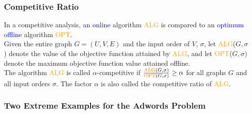 \begin{frame}
    \frametitle{Competitive Ratio}
    \begin{definition}
        In a \alert{competitive analysis}, an \textcolor{blue}{online} algorithm \textcolor{orange}{ALG} is compared to an \textcolor{blue}{optimum offline} algorithm \textcolor{orange}{OPT}.\\
        \smallskip
        Given the entire graph $G = (U,V,E)$ and the input order of $V$, $\sigma$, let \textcolor{orange}{ALG}($G, \sigma$) denote the value of the objective function attained by \textcolor{orange}{ALG}, and let \textcolor{orange}{OPT}($G, \sigma$) denote the maximum objective function value attained offline.\\
        \smallskip
        The algorithm \textcolor{orange}{ALG} is called $\alpha$-\alert{competitive} if $\frac{\text{\textcolor{orange}{ALG}}(G, \sigma)}{\text{\textcolor{orange}{OPT}}(G, \sigma)} \geq \alpha$ for all graphs $G$ and all input orders $\sigma$. The factor $\alpha$ is also called the \alert{competitive ratio} of \textcolor{orange}{ALG}.
    \end{definition}
\end{frame}

\begin{frame}
    \frametitle{Two Extreme Examples for the Adwords Problem}
    \begin{example}
        \centering
        \flushleft
    \end{example}
\end{frame}

